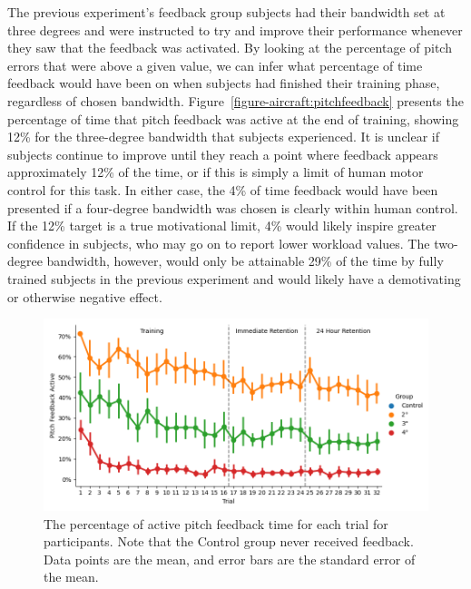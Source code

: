 The previous experiment's feedback group subjects had their bandwidth set at three degrees and were instructed to try and improve their performance whenever they saw that the feedback was activated.
By looking at the percentage of pitch errors that were above a given value, we can infer what percentage of time feedback would have been on when subjects had finished their training phase, regardless of chosen bandwidth.
Figure~\ref{figure-aircraft:pitchfeedback} presents the percentage of time that pitch feedback was active at the end of training, showing 12\% for the three-degree bandwidth that subjects experienced.
It is unclear if subjects continue to improve until they reach a point where feedback appears approximately 12\% of the time, or if this is simply a limit of human motor control for this task.
In either case, the 4\% of time feedback would have been presented if a four-degree bandwidth was chosen is clearly within human control.
If the 12\% target is a true motivational limit, 4\% would likely inspire greater confidence in subjects, who may go on to report lower workload values.
The two-degree bandwidth, however, would only be attainable 29\% of the time by fully trained subjects in the previous experiment and would likely have a demotivating or otherwise negative effect.

\begin{figure}[tb]
    \begin{center}
        \includegraphics[width=\linewidth]{figures/Aircraft/Bandwidth-PitchFeedbackOn.png}
        \caption[The percentage of active pitch feedback time for each trial]{The percentage of active pitch feedback time for each trial for participants. Note that the Control group never received feedback. Data points are the mean, and error bars are the standard error of the mean.}
        \label{figure-bw:pitchfeedback}
    \end{center}
\end{figure}

